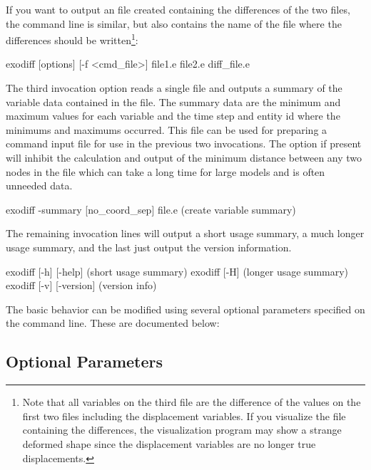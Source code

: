 If you want \exodiff{} to output an \exo{} file created containing the differences of the two
files, the command line is similar, but also contains the name of the
file where the differences should be written\footnote{Note that all
variables on the third file are the difference of the values on the
first two files including the displacement variables.  If you
visualize the file containing the differences, the visualization program may show a strange
deformed shape since the displacement variables are no longer true displacements.}:
\begin{syntax}
     exodiff [{options}] [-f <cmd\_file>] file1.e file2.e diff_file.e
\end{syntax}

The third invocation option reads a single file and outputs a summary
of the variable data contained in the file.  The summary data are the
minimum and maximum values for each variable and the time step and
entity id where the minimums and maximums occurred.  This file can be
used for preparing a command input file for use in the previous two
invocations.  The  option if present will
inhibit the calculation and output of the minimum distance between any
two nodes in the file which can take a long time for large models and
is often unneeded data.
\begin{syntax}
     exodiff -summary [no\_coord\_sep] file.e (create variable summary)
\end{syntax}

The remaining invocation lines will output a short usage summary, a
much longer usage summary, and the last just output the version
information.

\begin{syntax}
     exodiff [-h] [-help]             (short usage summary)
     exodiff [-H]                     (longer usage summary)
     exodiff [-v] [-version]          (version info)
\end{syntax}

The basic behavior can be modified using several optional parameters
specified on the command line.  These are documented below:

\subsection{Optional Parameters}

